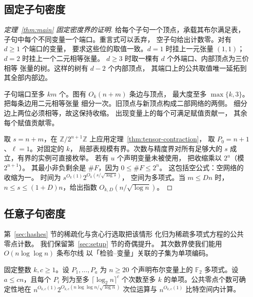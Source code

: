 \subsection{固定子句密度}\label{subsec:sharp-fixed-density}

\begin{proof}[定理~\ref{thm:main} 固定密度界的证明]
给每个子句一个顶点，承载其布尔满足表，
子句中每个不同变量一个端口。重言式可以丢弃，
空子句给出计数零。对有 $d\ge1$ 个端口的变量，
要求这些位的取值一致。$d=1$ 时挂上一元张量
$(1,1)$；$d=2$ 时挂上一个二元相等张量。
$d\ge3$ 时取一棵有 $d$ 个外端口、内部顶点为三价相等
张量的树。这样的树有 $d-2$ 个内部顶点，
其端口上的公共取值唯一延拓到其全部内部边。

子句端口至多 $km$ 个。图有 $O_k(n+m)$ 条边与顶点，
最大度至多 $\max\{k,3\}$。把每条边用二元相等张量
细分一次。旧顶点与新顶点构成二部网络的两侧。
细分边上两位必须相等，故这保持收缩。
出现变量上的每个可满足赋值贡献一，
其余每个赋值贡献零。

取 $s=n+m$，在 $\mathbb Z/2^{n+1}\mathbb Z$
上应用定理~\ref{thm:tensor-contraction}，
取 $P_0=n+1$、$\ell=1$。对固定的 $k$，
局部表规模有界。次数与精度界对所有足够大的 $s$
成立，有界的实例可直接枚举。
若有 $u$ 个声明变量未被使用，
把收缩乘以 $2^u$（模 $2^{n+1}$）。
其最小非负剩余是 $\#F$，因为 $0\le\#F\le2^n$。
这包括空公式：空网络的收缩为一。
时间为 $s^{O_k(1)}2^{O_k(s/\sqrt{\log s})}$，
空间为多项式。当 $m\le Dn$ 时，
$n\le s\le(1+D)n$，给出指数
$O_{k,D}(n/\sqrt{\log n})$。
\end{proof}

\subsection{任意子句密度}\label{subsec:sharp-dense}

第~\ref{sec:hashes} 节的稀疏化与贪心行选取把该情形
化归为稀疏多项式方程的公共零点计数。
我们保留第~\ref{sec:setup} 节的奇偶提升。
其次数界使我们能用 $O(n\log\log n)$ 条布尔线
以「检验--变量」关联的子集为单项编码。

\begin{lemma}[用收缩计数稀疏多项式方程组]
\label{lem:tensor-sparse-query}
固定整数 $k,c\ge1$。设 $P_1,\ldots,P_a$
为 $n\ge20$ 个声明布尔变量上的 $\mathbb F_2$
多项式。设 $a\le cn$，且每个 $P_i$
列为至多 $\lceil\log_2 n\rceil^c$
个次数至多 $k$ 的单项。公共零点个数可确定性地在
$n^{O_{k,c}(1)}2^{O_{k,c}(n\log\log n/\sqrt{\log n})}$
次位运算与 $n^{O_{k,c}(1)}$ 比特空间内计算。
\end{lemma}

